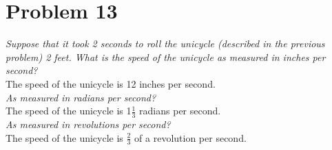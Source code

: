 \documentclass[11pt]{article} %
\newcommand\tab[1][1cm]{\hspace*{#1}}
\begin{document}
\section{Problem 13}
\textit{Suppose that it took 2 seconds to roll the unicycle (described in the previous problem) 2 feet. What is the speed of the unicycle as measured in inches per second?}\\
\tab The speed of the unicycle is 12 inches per second. 
\\ \textit{As measured in radians per second?}\\
\tab The speed of the unicycle is 1$\frac{1}{3}$ radians per second.
\\ \textit{As measured in revolutions per second?}
\\
\tab The speed of the unicycle is $\frac{2}{3}$ of a revolution per second.
\end{document}

